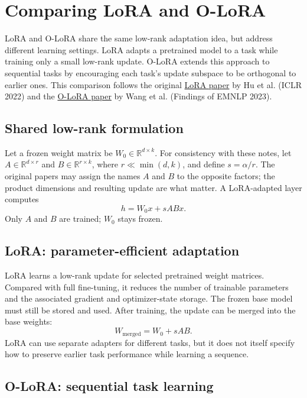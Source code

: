 \section{Comparing LoRA and O-LoRA}

LoRA and O-LoRA share the same low-rank adaptation idea, but address different learning settings. LoRA adapts a pretrained model to a task while training only a small low-rank update. O-LoRA extends this approach to sequential tasks by encouraging each task's update subspace to be orthogonal to earlier ones. This comparison follows the original \href{https://openreview.net/forum?id=nZeVKeeFYf9}{LoRA paper} by Hu et al. (ICLR 2022) and the \href{https://aclanthology.org/2023.findings-emnlp.715/}{O-LoRA paper} by Wang et al. (Findings of EMNLP 2023).

\subsection{Shared low-rank formulation}

Let a frozen weight matrix be \(W_0\in\mathbb{R}^{d\times k}\). For consistency with these notes, let \(A\in\mathbb{R}^{d\times r}\) and \(B\in\mathbb{R}^{r\times k}\), where \(r\ll\min(d,k)\), and define \(s=\alpha/r\). The original papers may assign the names \(A\) and \(B\) to the opposite factors; the product dimensions and resulting update are what matter. A LoRA-adapted layer computes
\[
  h=W_0x+sABx.
\]
Only \(A\) and \(B\) are trained; \(W_0\) stays frozen.

\subsection{LoRA: parameter-efficient adaptation}

LoRA learns a low-rank update for selected pretrained weight matrices. Compared with full fine-tuning, it reduces the number of trainable parameters and the associated gradient and optimizer-state storage. The frozen base model must still be stored and used. After training, the update can be merged into the base weights:
\[
  W_{\mathrm{merged}}=W_0+sAB.
\]
LoRA can use separate adapters for different tasks, but it does not itself specify how to preserve earlier task performance while learning a sequence.

\subsection{O-LoRA: sequential task learning}

